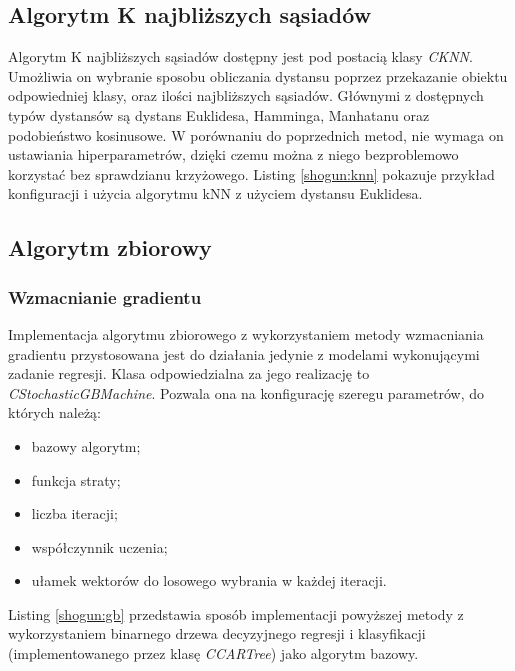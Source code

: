 \subsection{Algorytm K najbliższych sąsiadów}

Algorytm K najbliższych sąsiadów dostępny jest pod postacią klasy \textit{CKNN}. Umożliwia on wybranie sposobu obliczania dystansu poprzez przekazanie obiektu odpowiedniej klasy, oraz ilości najbliższych sąsiadów. Głównymi z dostępnych typów dystansów są dystans Euklidesa, Hamminga, Manhatanu oraz podobieństwo kosinusowe. W porównaniu do poprzednich metod, nie wymaga on ustawiania hiperparametrów, dzięki czemu można z niego bezproblemowo korzystać bez sprawdzianu krzyżowego. Listing \ref{shogun:knn} pokazuje przykład konfiguracji i użycia algorytmu kNN z użyciem dystansu Euklidesa.


\subsection{Algorytm zbiorowy}
\subsubsection{Wzmacnianie gradientu}
Implementacja algorytmu zbiorowego z wykorzystaniem metody wzmacniania gradientu przystosowana jest do działania jedynie z modelami wykonującymi zadanie regresji. Klasa odpowiedzialna za jego realizację to \textit{CStochasticGBMachine}. Pozwala ona na konfigurację szeregu parametrów, do których należą:

\begin{itemize}
	\item bazowy algorytm;
	\item funkcja straty;
	\item liczba iteracji;
	\item współczynnik uczenia;
	\item ułamek wektorów do losowego wybrania w każdej iteracji.
\end{itemize}

Listing \ref{shogun:gb} przedstawia sposób implementacji powyższej metody z wykorzystaniem binarnego drzewa decyzyjnego regresji i klasyfikacji (implementowanego przez klasę \textit{CCARTree}) jako algorytm bazowy. 


